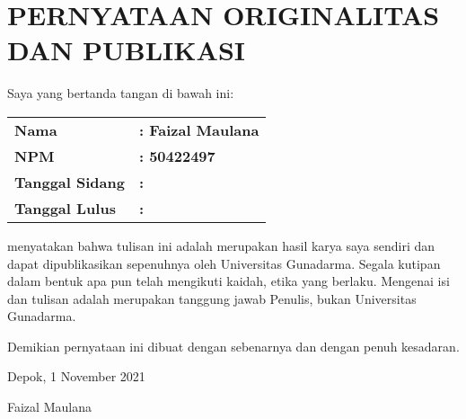 \section{PERNYATAAN ORIGINALITAS DAN PUBLIKASI}
\vspace{1em}

Saya yang bertanda tangan di bawah ini:

\begin{table}[H]
  \begin{tabular}{l l}
    \textbf{Nama} & \textbf{: Faizal Maulana} \\
    \textbf{NPM} & \textbf{: 50422497} \\
    \textbf{Tanggal Sidang} & \textbf{: } \\
    \textbf{Tanggal Lulus} & \textbf{: }
  \end{tabular}
\end{table}

\vspace{-1em}


menyatakan bahwa tulisan ini adalah merupakan hasil karya saya sendiri dan 
dapat dipublikasikan sepenuhnya oleh Universitas Gunadarma. Segala kutipan dalam 
bentuk apa pun telah mengikuti kaidah, etika yang berlaku. Mengenai isi dan 
tulisan adalah merupakan tanggung jawab Penulis, bukan Universitas Gunadarma.

Demikian pernyataan ini dibuat dengan sebenarnya dan dengan penuh kesadaran.

\vspace{1em}

Depok, 1 November 2021

\vspace{5em}

Faizal Maulana
